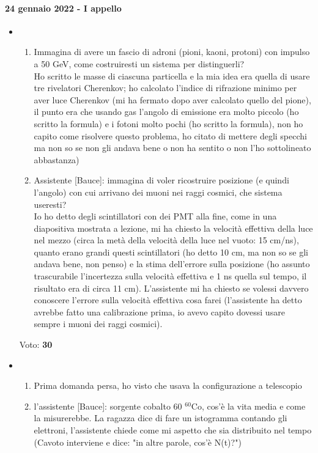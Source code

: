 \documentclass[../main.tex]{subfiles}
\begin{document}
\paragraph{24 gennaio 2022 - I appello}
\begin{itemize}
\item 
\begin{enumerate}
    \item Immagina di avere un fascio di adroni (pioni, kaoni, protoni) con impulso a 50 GeV, come costruiresti un sistema per distinguerli?\\
Ho scritto le masse di ciascuna particella e la mia idea era quella di usare tre rivelatori Cherenkov; ho calcolato l'indice di rifrazione minimo per aver luce Cherenkov (mi ha fermato dopo aver calcolato quello del pione), il punto era che usando gas l'angolo di emissione era molto piccolo (ho scritto la formula) e i fotoni molto pochi (ho scritto la formula), non ho capito come risolvere questo problema, ho citato di mettere degli specchi ma non so se non gli andava bene o non ha sentito o non l'ho sottolineato abbastanza)
\item Assistente [Bauce]: immagina di voler ricostruire posizione (e quindi l'angolo) con cui arrivano dei muoni nei raggi cosmici, che sistema useresti?\\ 
Io ho detto degli scintillatori con dei PMT alla fine, come in una diapositiva mostrata a lezione, mi ha chiesto la velocità effettiva della luce nel mezzo (circa la metà della velocità della luce nel vuoto: 15 cm/ns), quanto erano grandi questi scintillatori (ho detto 10 cm, ma non so se gli andava bene, non penso) e la stima dell'errore sulla posizione (ho assunto trascurabile l'incertezza sulla velocità effettiva e 1 ns quella sul tempo, il risultato era di circa 11 cm). L'assistente mi ha chiesto se volessi davvero conoscere l'errore sulla velocità effettiva cosa farei (l'assistente ha detto avrebbe fatto una calibrazione prima, io avevo capito dovessi usare sempre i muoni dei raggi cosmici).
\end{enumerate}
Voto: {\bf 30}
\item \begin{enumerate}
\item Prima domanda persa, ho visto che usava la configurazione a telescopio
\item  l'assistente [Bauce]: sorgente cobalto 60 $^{60}$Co, cos'è la vita media e come la misurerebbe. La ragazza dice di fare un istogramma contando gli elettroni, l'assistente chiede come mi aspetto che sia distribuito nel tempo (Cavoto interviene e dice: "in altre parole, cos'è N(t)?")

\end{enumerate}
\end{itemize}
\end{document}
